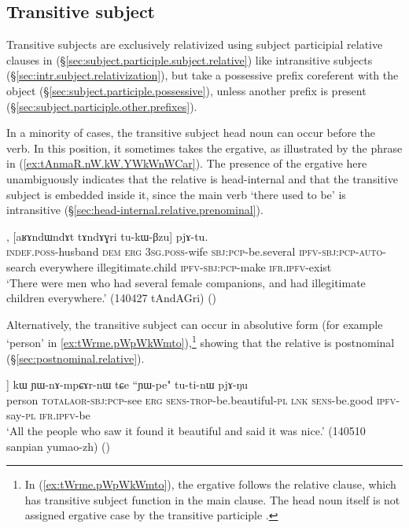 \subsection{Transitive subject}  \label{sec:tr.subject.relativization}
Transitive subjects are exclusively relativized using subject participial relative clauses in  (§\ref{sec:subject.participle.subject.relative}) like intransitive subjects (§\ref{sec:intr.subject.relativization}), but take a possessive prefix coreferent with the object (§\ref{sec:subject.participle.possessive}), unless another prefix is present (§\ref{sec:subject.participle.other.prefixes}).

In a minority of cases, the transitive subject head noun can occur before the verb. In this position, it sometimes takes the ergative, as illustrated by the phrase  in (\ref{ex:tAnmaR.nW.kW.YWkWnWCar}). The presence of the ergative here unambiguously indicates that the relative is head-internal and that the transitive subject is embedded inside it, since the main verb  `there used to be' is intransitive (§\ref{sec:head-internal.relative.prenominal}).
 
\begin{exe}
\ex \label{ex:tAnmaR.nW.kW.YWkWnWCar}
, [aʁɤndɯndɤt tɤndɤɣri tu-kɯ-βzu] pjɤ-tu. \\
\textsc{indef}.\textsc{poss}-husband \textsc{dem} \textsc{erg} \textsc{3sg}.\textsc{poss}-wife \textsc{sbj}:\textsc{pcp}-be.several \textsc{ipfv}-\textsc{sbj}:\textsc{pcp}-\textsc{auto}-search everywhere illegitimate.child \textsc{ipfv}-\textsc{sbj}:\textsc{pcp}-make \textsc{ifr}.\textsc{ipfv}-exist \\
\glt `There were men who had several female companions, and had illegitimate children everywhere.' (140427 tAndAGri)
()
\end{exe} 

Alternatively, the transitive subject can occur in absolutive form (for example  `person' in \ref{ex:tWrme.pWpWkWmto}),\footnote{In (\ref{ex:tWrme.pWpWkWmto}), the ergative  follows the relative clause, which has transitive subject function in the main clause. The head noun  itself is not assigned ergative case by the transitive participle . } showing that the relative is postnominal (§\ref{sec:postnominal.relative}).

\begin{exe}
\ex \label{ex:tWrme.pWpWkWmto}
\gll [\textbf{tɯrme} [pɯ\redp{}pɯ-kɯ-mto]] kɯ ɲɯ-nɤ-mpɕɤr-nɯ tɕe ``ɲɯ-pe" tu-ti-nɯ pjɤ-ŋu \\
person \textsc{total}\redp{}\textsc{aor}-\textsc{sbj}:\textsc{pcp}-see \textsc{erg} \textsc{sens}-\textsc{trop}-be.beautiful-\textsc{pl} \textsc{lnk} \textsc{sens}-be.good \textsc{ipfv}-say-\textsc{pl} \textsc{ifr}.\textsc{ipfv}-be \\
\glt `All the people who saw it found it beautiful and said it was nice.' (140510 sanpian yumao-zh)
()
\end{exe}

